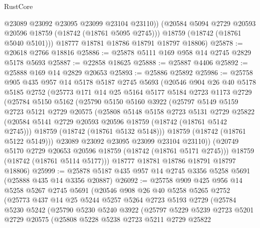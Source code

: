 \begin{lexlean}{RustCore}
\begin{coremodule}
            @23089
            @23092
            @23095
            @23099
            @23104
            @23110))
        (@20584 @5094 @2729 @20593 @20596 @18759 (@18742 (@18761 @5095 @2745)))
        @18759
        (@18742 (@18761 @5040 @5101)))
      @18777
      @18781
      @18786
      @18791
      @18797
      @18806)
@25878 := @20618 @2766 @18816
@25886 := @25878 @5111 @169 @958 @14 @2745 @2829 @5178 @5693
@25887 := @22858 @18625
@25888 := @25887 @4406
@25892 := @25888 @169 @14 @2829 @20653
@25893 := @25886 @25892
@25986 := @25758
    @905
    @435
    @957
    @14
    @5178
    @5187
    @2745
    @5693
    (@20546
      @904
      @26
      @40
      @5178
      @5185
      @2752
      (@25773
        @171
        @14
        @25
        @5164
        @5177
        @5184
        @2723
        @1173
        @2729
        (@25784
          @5150
          @5162
          (@25790
            @5150
            @5160
            @3922
            (@25797
              @5149
              @5159
              @2723
              @5121
              @2729
              @20575
              (@25808
                @5148
                @5158
                @2723
                @5131
                @2729
                @25822
                (@20584 @5141 @2729 @20593 @20596 @18759 (@18742 (@18761 @5142 @2745)))
                @18759
                (@18742 (@18761 @5132 @5148)))
              @18759
              (@18742 (@18761 @5122 @5149)))
            @23089
            @23092
            @23095
            @23099
            @23104
            @23110))
        (@20749 @5170 @2729 @20653 @20596 @18759 (@18742 (@18761 @5171 @2745)))
        @18759
        (@18742 (@18761 @5114 @5177)))
      @18777
      @18781
      @18786
      @18791
      @18797
      @18806)
@25999 := @25878 @5187 @435 @957 @14 @2745 @3356 @5258 @5691 (@25888 @435 @14 @3356 @20887)
@26092 := @25758
    @909
    @425
    @956
    @14
    @5258
    @5267
    @2745
    @5691
    (@20546
      @908
      @26
      @40
      @5258
      @5265
      @2752
      (@25773
        @437
        @14
        @25
        @5244
        @5257
        @5264
        @2723
        @5193
        @2729
        (@25784
          @5230
          @5242
          (@25790
            @5230
            @5240
            @3922
            (@25797
              @5229
              @5239
              @2723
              @5201
              @2729
              @20575
              (@25808
                @5228
                @5238
                @2723
                @5211
                @2729
                @25822

\end{coremodule}
\end{lexlean}
